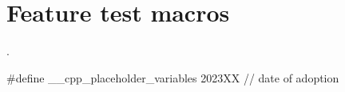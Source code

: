 \documentclass{wg21}
\begin{document}
{\section{Feature test macros}

.

\begin{addedblock}
\begin{codeblock}
#define __cpp_placeholder_variables 2023XX // date of adoption
\end{codeblock}
\end{addedblock}

%
%

}
\end{document}

